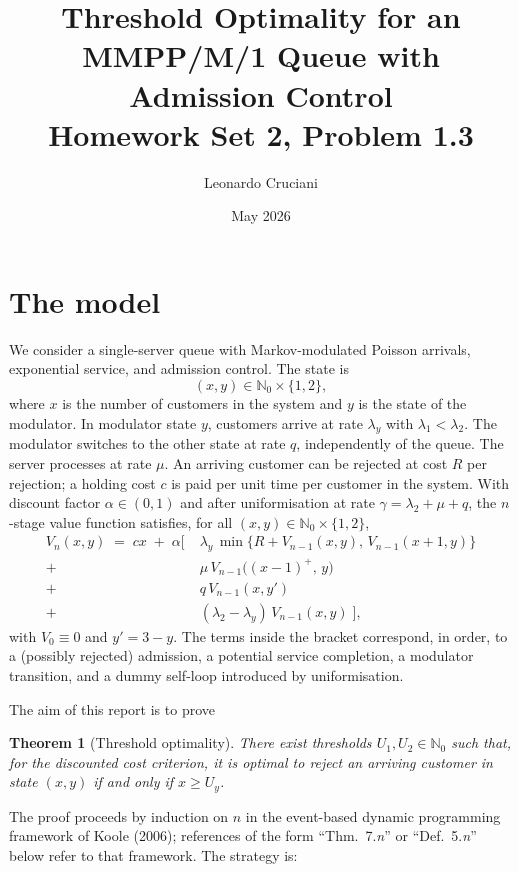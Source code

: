 \documentclass[11pt,a4paper]{article}
\title{Threshold Optimality for an MMPP/M/1 Queue with Admission Control\\[0.3em]
       \large Homework Set 2, Problem 1.3}
\author{Leonardo Cruciani}
\date{May 2026}
\newcommand{\N}{\mathbb{N}}
\newtheorem{theorem}{Theorem}
\theoremstyle{definition}
\begin{document}
\maketitle

\section{The model}

We consider a single-server queue with Markov-modulated Poisson arrivals,
exponential service, and admission control. The state is
\[
    (x, y) \in \N_0 \times \{1, 2\},
\]
where $x$ is the number of customers in the system and $y$ is the
state of the modulator. In modulator state $y$, customers arrive at
rate $\lambda_y$ with $\lambda_1 < \lambda_2$. The modulator switches
to the other state at rate $q$, independently of the queue. The
server processes at rate $\mu$. An arriving customer can be rejected
at cost $R$ per rejection; a holding cost $c$ is paid per unit time
per customer in the system. With discount factor $\alpha \in (0, 1)$
and after uniformisation at rate $\gamma = \lambda_2 + \mu + q$, the
$n$-stage value function satisfies, for all $(x, y) \in \N_0 \times
\{1, 2\}$,
\begin{equation}
\label{eq:V}
\begin{aligned}
V_n(x, y) \;=\; cx \;+\; \alpha\Big[\;
        & \lambda_y\, \min\{R + V_{n-1}(x, y),\, V_{n-1}(x + 1, y)\} \\
    +\, & \mu\, V_{n-1}\big((x - 1)^+,\, y\big) \\
    +\, & q\, V_{n-1}(x, y') \\
    +\, & (\lambda_2 - \lambda_y)\, V_{n-1}(x, y)
\;\Big],
\end{aligned}
\end{equation}
with $V_0 \equiv 0$ and $y' = 3 - y$. The terms inside the bracket
correspond, in order, to a (possibly rejected) admission, a potential
service completion, a modulator transition, and a dummy self-loop
introduced by uniformisation.

The aim of this report is to prove

\begin{theorem}[Threshold optimality]
\label{thm:5}
There exist thresholds $U_1, U_2 \in \N_0$ such that, for the
discounted cost criterion, it is optimal to reject an arriving
customer in state $(x, y)$ if and only if $x \ge U_y$.
\end{theorem}

The proof proceeds by induction on $n$ in the event-based dynamic
programming framework of Koole (2006); references of the form
``Thm.~7.\textit{n}'' or ``Def.~5.\textit{n}'' below refer to that
framework. The strategy is:
\end{document}
